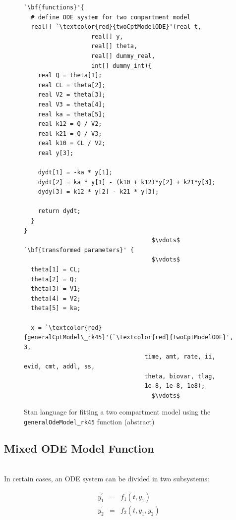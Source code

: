 \documentclass[11pt]{amsart}
\newenvironment{fmpage}[1]
     {\begin{lrbox}{\fmbox}\begin{minipage}{#1}}
     {\end{minipage}\end{lrbox}\fbox{\usebox{\fmbox}}}
\begin{document}
\begin{figure}
\caption{Stan language for fitting a two compartment model using the \texttt{generalOdeModel\_rk45} function (abstract)}
\begin{center}
\begin{small}
\begin{fmpage}{\textwidth - .75in}
\begin{lstlisting}[basicstyle=\footnotesize\ttfamily,mathescape=true,flexiblecolumns=true,frame=single,escapeinside=`']
`\bf{functions}'{
  # define ODE system for two compartment model
  real[] `\textcolor{red}{twoCptModelODE}'(real t,
			       real[] y,
			       real[] theta,
			       real[] dummy_real,
			       int[] dummy_int){
    real Q = theta[1];
    real CL = theta[2];
    real V2 = theta[3];
    real V3 = theta[4];
    real ka = theta[5];
    real k12 = Q / V2;
    real k21 = Q / V3;
    real k10 = CL / V2;
    real y[3]; 

    dydt[1] = -ka * y[1];
    dydt[2] = ka * y[1] - (k10 + k12)*y[2] + k21*y[3];
    dydy[3] = k12 * y[2] - k21 * y[3];

    return dydt;
  }
}
                                    $\vdots$
`\bf{transformed parameters}' {
                                    $\vdots$
  theta[1] = CL;
  theta[2] = Q;
  theta[3] = V1;
  theta[4] = V2;
  theta[5] = ka;

  x = `\textcolor{red}{generalCptModel\_rk45}'(`\textcolor{red}{twoCptModelODE}', 3,
                                  time, amt, rate, ii, evid, cmt, addl, ss,
                                  theta, biovar, tlag, 
                                  1e-8, 1e-8, 1e8);
                                    $\vdots$
\end{lstlisting}
\end{fmpage}
\end{small}
\end{center}
\label{GenTwoCptModelCode}
\end{figure}


\subsection{Mixed ODE Model Function} \ \\

In certain cases, an ODE system can be divided in two subsystems:

\begin{eqnarray*}
  y_1^\prime &=& f_1(t, y_1) \\
  y_2^\prime &=& f_2(t, y_1, y_2)
\end{eqnarray*} 
\end{document}
